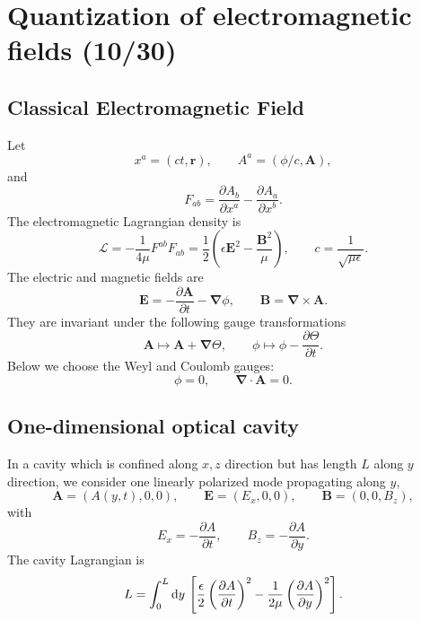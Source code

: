 \section{Quantization of electromagnetic fields (10/30)}


\subsection{Classical Electromagnetic Field}

Let
\begin{equation}
 x^a=(ct,\bm r),
 \qquad
 A^a=(\phi/c,\bm A),
\end{equation}
and
\begin{equation}
 F_{ab}=\frac{\partial A_b}{\partial x^a}
 -\frac{\partial A_a}{\partial x^b}.
\end{equation}
The electromagnetic Lagrangian density is
\begin{equation}
 \mathcal L=-\frac{1}{4\mu}F^{ab}F_{ab}
 =\frac12\left(\epsilon\bm E^2-\frac{\bm B^2}{\mu}\right),
 \qquad
 c=\frac{1}{\sqrt{\mu\epsilon}}.
\end{equation}
The electric and magnetic fields are
\begin{equation}
 \bm E=-\frac{\partial\bm A}{\partial t}-\bm\nabla\phi,
 \qquad
 \bm B=\bm\nabla\times\bm A.
\end{equation}
They are invariant under the following gauge transformations
\begin{equation}
 \bm A\longmapsto\bm A+\bm\nabla\Theta,
 \qquad
 \phi\longmapsto\phi-\frac{\partial\Theta}{\partial t}.
\end{equation}
Below we choose the Weyl and Coulomb gauges:
\begin{equation}
 \phi=0,
 \qquad
 \bm\nabla\cdot\bm A=0.
\end{equation}

\subsection{One-dimensional optical cavity}\label{section:1d optical cavity}

In a cavity which is confined along $x,z$ direction but has length $L$ along $y$ direction, we consider one linearly polarized mode propagating along $y$,
\begin{equation}
 \bm A=(A(y,t),0,0),
 \qquad
 \bm E=(E_x,0,0),
 \qquad
 \bm B=(0,0,B_z),
\end{equation}
with
\begin{equation}
 E_x=-\frac{\partial A}{\partial t},
 \qquad
 B_z=-\frac{\partial A}{\partial y}.
\end{equation}
The cavity Lagrangian is
\begin{equation}
 L=\int_0^L\mathrm{d} y\,
 \left[
 \frac{\epsilon}{2}\left(\frac{\partial A}{\partial t}\right)^2
 -\frac{1}{2\mu}\left(\frac{\partial A}{\partial y}\right)^2
 \right].
\end{equation}


